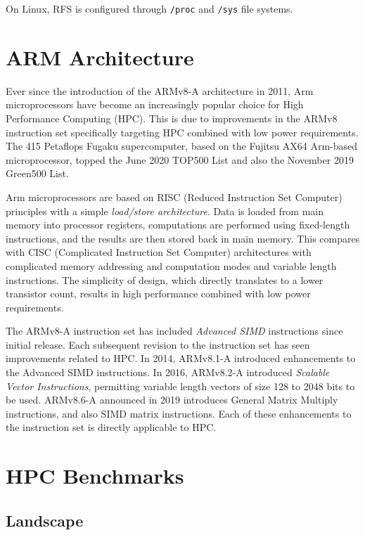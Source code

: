 On Linux, RFS is configured through \verb|/proc| and \verb|/sys| file systems.


%
%
\section{ARM Architecture}

Ever since the introduction of the ARMv8-A architecture in 2011, Arm microprocessors have become an increasingly popular choice for High Performance Computing (HPC). This is due to improvements in the ARMv8 instruction set specifically targeting HPC combined with low power requirements. The 415 Petaflops Fugaku supercomputer, based on the Fujitsu AX64 Arm-based microprocessor, topped the June 2020 TOP500 List and also the November 2019 Green500 List.

Arm microprocessors are based on RISC (Reduced Instruction Set Computer) principles with a simple \emph{load/store architecture}. Data is loaded from main memory into processor registers, computations are performed using fixed-length instructions, and the results are then stored back in main memory. This compares with CISC (Complicated Instruction Set Computer) architectures with complicated memory addressing and computation modes and variable length instructions. The simplicity of design, which directly translates to a lower transistor count, results in high performance combined with low power requirements.

The ARMv8-A instruction set has included \emph{Advanced SIMD} instructions since initial release. Each subsequent revision to the instruction set has seen improvements related to HPC. In 2014, ARMv8.1-A introduced enhancements to the Advanced SIMD instructions. In 2016, ARMv8.2-A introduced \emph{Scalable Vector Instructions}, permitting variable length vectors of size 128 to 2048 bits to be used. ARMv8.6-A announced in 2019 introduces General Matrix Multiply instructions, and also SIMD matrix instructions. Each of these enhancements to the instruction set is directly applicable to HPC.



%
%
\section{HPC Benchmarks}

\subsection{Landscape}

